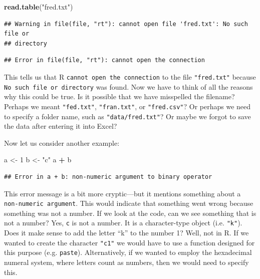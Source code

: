 \documentclass[]{book}
\newenvironment{Shaded}{\begin{snugshade}}{\end{snugshade}}
\newcommand{\KeywordTok}[1]{\textcolor[rgb]{0.13,0.29,0.53}{\textbf{#1}}}
\newcommand{\DecValTok}[1]{\textcolor[rgb]{0.00,0.00,0.81}{#1}}
\newcommand{\StringTok}[1]{\textcolor[rgb]{0.31,0.60,0.02}{#1}}
\newcommand{\OperatorTok}[1]{\textcolor[rgb]{0.81,0.36,0.00}{\textbf{#1}}}
\newcommand{\NormalTok}[1]{#1}
\begin{document}
\begin{Shaded}
\begin{Highlighting}[]
\KeywordTok{read.table}\NormalTok{(}\StringTok{"fred.txt"}\NormalTok{)}
\end{Highlighting}
\end{Shaded}

\begin{verbatim}
## Warning in file(file, "rt"): cannot open file 'fred.txt': No such file or
## directory
\end{verbatim}

\begin{verbatim}
## Error in file(file, "rt"): cannot open the connection
\end{verbatim}

This tells us that R \texttt{cannot\ open\ the\ connection} to the file
\texttt{"fred.txt"} because \texttt{No\ such\ file\ or\ directory} was
found. Now we have to think of all the reasons why this could be true.
Is it possible that we have misspelled the filename? Perhaps we meant
\texttt{"fed.txt"}, \texttt{"fran.txt"}, or \texttt{"fred.csv"}? Or
perhaps we need to specify a folder name, such as
\texttt{"data/fred.txt"}? Or maybe we forgot to save the data after
entering it into Excel?

Now let us consider another example:

\begin{Shaded}
\begin{Highlighting}[]
\NormalTok{a <-}\StringTok{ }\DecValTok{1}
\NormalTok{b <-}\StringTok{ "c"}
\NormalTok{a }\OperatorTok{+}\StringTok{ }\NormalTok{b}
\end{Highlighting}
\end{Shaded}

\begin{verbatim}
## Error in a + b: non-numeric argument to binary operator
\end{verbatim}

This error message is a bit more cryptic---but it mentions something
about a \texttt{non-numeric\ argument}. This would indicate that
something went wrong because something was not a number. If we look at
the code, can we see something that is not a number? Yes, \texttt{c} is
not a number. It is a character-type object (i.e. \texttt{"k"}). Does it
make sense to add the letter ``k'' to the number 1? Well, not in R. If
we wanted to create the character \texttt{"c1"} we would have to use a
function designed for this purpose (e.g. \texttt{paste}). Alternatively,
if we wanted to employ the hexadecimal numeral system, where letters
count as numbers, then we would need to specify this.
\end{document}
